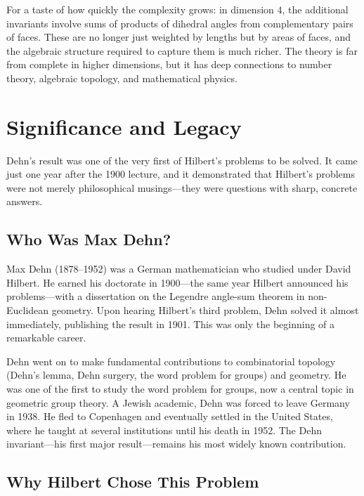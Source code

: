 \begin{remark}
For a taste of how quickly the complexity grows: in dimension $4$, the additional invariants involve sums of products of dihedral angles from complementary pairs of faces. These are no longer just weighted by lengths but by areas of faces, and the algebraic structure required to capture them is much richer. The theory is far from complete in higher dimensions, but it has deep connections to number theory, algebraic topology, and mathematical physics.
\end{remark}

\section{Significance and Legacy}

Dehn's result was one of the very first of Hilbert's problems to be solved. It came just one year after the 1900 lecture, and it demonstrated that Hilbert's problems were not merely philosophical musings---they were questions with sharp, concrete answers.

\subsection{Who Was Max Dehn?}

Max Dehn (1878--1952) was a German mathematician who studied under David Hilbert. He earned his doctorate in 1900---the same year Hilbert announced his problems---with a dissertation on the Legendre angle-sum theorem in non-Euclidean geometry. Upon hearing Hilbert's third problem, Dehn solved it almost immediately, publishing the result in 1901. This was only the beginning of a remarkable career.

Dehn went on to make fundamental contributions to combinatorial topology (Dehn's lemma, Dehn surgery, the word problem for groups) and geometry. He was one of the first to study the word problem for groups, now a central topic in geometric group theory. A Jewish academic, Dehn was forced to leave Germany in 1938. He fled to Copenhagen and eventually settled in the United States, where he taught at several institutions until his death in 1952. The Dehn invariant---his first major result---remains his most widely known contribution.

\subsection{Why Hilbert Chose This Problem}

